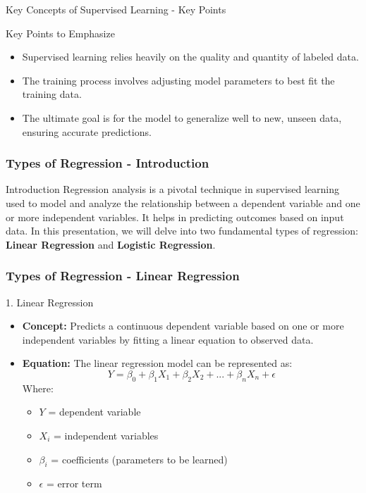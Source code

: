 \documentclass[aspectratio=169]{beamer}
\begin{document}
\begin{frame}[fragile]{Key Concepts of Supervised Learning - Key Points}
    \begin{block}{Key Points to Emphasize}
        \begin{itemize}
            \item Supervised learning relies heavily on the quality and quantity of labeled data.
            \item The training process involves adjusting model parameters to best fit the training data.
            \item The ultimate goal is for the model to generalize well to new, unseen data, ensuring 
            accurate predictions.
        \end{itemize}
    \end{block}
\end{frame}

\begin{frame}[fragile]
\frametitle{Types of Regression - Introduction}
\begin{block}{Introduction}
Regression analysis is a pivotal technique in supervised learning used to model and analyze the relationship between a dependent variable and one or more independent variables. It helps in predicting outcomes based on input data. In this presentation, we will delve into two fundamental types of regression: \textbf{Linear Regression} and \textbf{Logistic Regression}.
\end{block}
\end{frame}

\begin{frame}[fragile]
\frametitle{Types of Regression - Linear Regression}
\begin{block}{1. Linear Regression}
\begin{itemize}
    \item \textbf{Concept:} Predicts a continuous dependent variable based on one or more independent variables by fitting a linear equation to observed data.
    \item \textbf{Equation:} The linear regression model can be represented as:
    \begin{equation}
    Y = \beta_0 + \beta_1X_1 + \beta_2X_2 + ... + \beta_nX_n + \epsilon
    \end{equation}
    Where:
    \begin{itemize}
        \item \(Y\) = dependent variable
        \item \(X_i\) = independent variables
        \item \(\beta_i\) = coefficients (parameters to be learned)
        \item \(\epsilon\) = error term
    \end{itemize}
\end{itemize}
\end{block}
\end{frame}
\end{document}
